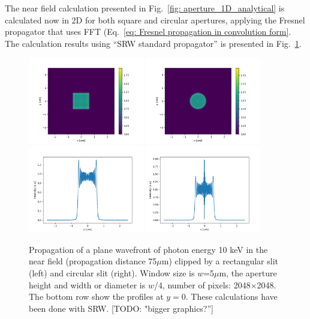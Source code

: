 \documentclass{iucr}              %
\newcommand{\todo}[1]{{\color{red}[TODO: "#1'']}}
\begin{document}
The near field calculation presented in Fig.~\ref{fig: aperture_1D_analytical} is calculated now in 2D for both square and circular apertures, applying the Fresnel propagator that uses FFT (Eq.~\ref{eq: Fresnel propagation in convolution form}. The calculation results using ``SRW standard propagator'' is presented in Fig.~\ref{fig: SRW aperture}. 
\begin{figure}
\label{fig: SRW aperture}
\caption{Propagation of a plane wavefront of photon energy 10 keV in the near field (propagation distance 75$\mu$m) clipped by a rectangular slit (left) and circular slit (right). Window size is $w$=5$\mu$m, the aperture height and width or diameter is $w$/4, number of pixels: 2048$\times$2048. The bottom row show the profiles at $y=0$. These calculations have been done with SRW. \todo{bigger graphics?}
}
\includegraphics[width=0.45\textwidth]{aperture_2D_rectangular_srw.png}
\includegraphics[width=0.45\textwidth]{aperture_2D_circular_srw.png}
\includegraphics[width=0.45\textwidth]{aperture_2D_rectangular_profile_srw.png}
\includegraphics[width=0.45\textwidth]{aperture_2D_circular_profile_srw.png}
\end{figure}
\end{document}
